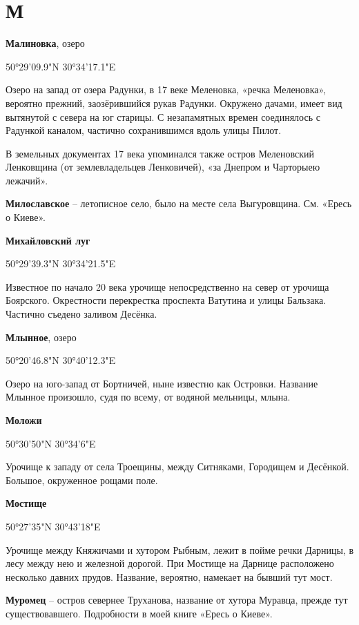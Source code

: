 \chapter*{М}

\textbf{Малиновка}, озеро 

50°29'09.9"N 30°34'17.1"E

Озеро на запад от озера Радунки, в 17 веке  Меленовка, «речка Меленовка», вероятно прежний, заозёрившийся рукав Радунки. Окружено дачами, имеет вид вытянутой с севера на юг старицы. С незапамятных времен соединялось с Радункой каналом, частично сохранившимся вдоль улицы Пилот.

В земельных документах 17 века упоминался также остров Меленовский Ленковщина (от землевладельцев Ленковичей), «за Днепром и Чарторыею лежачий».\\

\medskip

\textbf{Милославское} – летописное село, было на месте села Выгуровщина. См. «Ересь о Киеве».\\

\medskip

\textbf{Михайловский луг} 

50°29'39.3"N 30°34'21.5"E

Известное по начало 20 века урочище непосредственно на север от урочища Боярского. Окрестности перекрестка проспекта Ватутина и улицы Бальзака. Частично съедено заливом Десёнка.\\

\medskip

\textbf{Млынное}, озеро

50°20'46.8"N 30°40'12.3"E

Озеро на юго-запад от Бортничей, ныне известно как Островки. Название Млынное произошло, судя по всему, от водяной мельницы, млына.\\

\medskip

\textbf{Моложи} 

50°30'50"N 30°34'6"E

Урочище к западу от села Троещины, между Ситняками, Городищем и Десёнкой. Большое, окруженное рощами поле.\\

\medskip

\textbf{Мостище}

50°27'35"N 30°43'18"E

Урочище между Княжичами и хутором Рыбным, лежит в пойме речки Дарницы, в лесу между нею и железной дорогой. При Мостище на Дарнице расположено несколько давних прудов. Название, вероятно, намекает на бывший тут мост.\\

\medskip

\textbf{Муромец} – остров севернее Труханова, название от хутора Муравца, прежде тут существовавшего. Подробности в моей книге «Ересь о Киеве».
